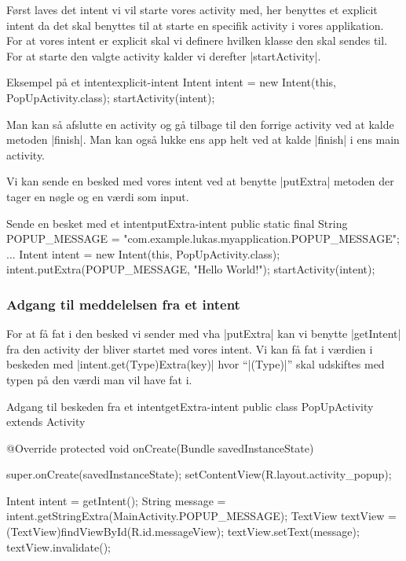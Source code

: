 Først laves det intent vi vil starte vores activity med, her benyttes et explicit intent da det skal benyttes til at starte en specifik activity i vores applikation. For at vores intent er explicit skal vi definere hvilken klasse den skal sendes til. For at starte den valgte activity kalder vi derefter \JavaInline|startActivity|.

\begin{example}\noindent
	\begin{JavaCode}{Eksempel på et intent}{explicit-intent}
		Intent intent = new Intent(this, PopUpActivity.class);
		startActivity(intent);
	\end{JavaCode}
\end{example}

Man kan så afslutte en activity og gå tilbage til den forrige activity ved at kalde metoden \JavaInline|finish|. Man kan også lukke ens app helt ved at kalde \JavaInline|finish| i ens main activity.

Vi kan sende en besked med vores intent ved at benytte \JavaInline|putExtra| metoden der tager en nøgle og en værdi som input.

\begin{example}\noindent
	\begin{JavaCode}{Sende en besket med et intent}{putExtra-intent}
		public static final String POPUP_MESSAGE = "com.example.lukas.myapplication.POPUP_MESSAGE";
		...
		Intent intent = new Intent(this, PopUpActivity.class);
		intent.putExtra(POPUP_MESSAGE, "Hello World!");
		startActivity(intent);
	\end{JavaCode}
\end{example}

\subsubsection{Adgang til meddelelsen fra et intent}

For at få fat i den besked vi sender med vha \JavaInline|putExtra| kan vi benytte \JavaInline|getIntent| fra den activity der bliver startet med vores intent. Vi kan få fat i værdien i beskeden med \JavaInline|intent.get(Type)Extra(key)|  hvor ``\JavaInline|(Type)|'' skal udskiftes med typen på den værdi man vil have fat i.

\begin{example}\noindent
	\begin{JavaCode}{Adgang til beskeden fra et intent}{getExtra-intent}
		public class PopUpActivity extends Activity {
			
			@Override
			protected void onCreate(Bundle savedInstanceState) {
				super.onCreate(savedInstanceState);
				setContentView(R.layout.activity_popup);
				
				Intent intent = getIntent();
				String message = intent.getStringExtra(MainActivity.POPUP_MESSAGE);
				TextView textView = (TextView)findViewById(R.id.messageView);
				textView.setText(message);
				textView.invalidate();
			}
		}
	\end{JavaCode}
\end{example}


